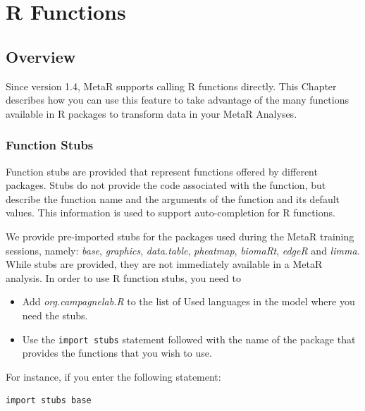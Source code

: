 


\chapter{R Functions}\label{chap:RFunctions}

\section{Overview}
Since version 1.4, MetaR supports calling R functions directly. This Chapter describes how you can use this feature to take advantage of the many functions available in R packages to transform data in your MetaR Analyses. 

\subsection{Function Stubs}
Function stubs are provided that represent functions offered by different packages. Stubs do not provide the code associated with the function, but describe the function name and the arguments of the function and its default values. This information is used to support auto-completion for R functions. 

We provide pre-imported stubs for the packages used during the MetaR training sessions, namely: \textit{base}, \textit{graphics}, \textit{data.table}, \textit{pheatmap}, \textit{biomaRt}, \textit{edgeR} and \textit{limma}. While stubs are provided, they are not immediately available in a MetaR analysis. In order to use R function stubs, you need to 
\begin{itemize}
  \item Add \textit{org.campagnelab.R} to the list of Used languages in the model where you need the stubs.
  \item Use the \texttt{import stubs} statement followed with the name of the package that provides the functions that you wish to use.
\end{itemize}

\noindent{}For instance, if you enter the following statement: 
\begin{lstlisting}
import stubs base
\end{lstlisting}

